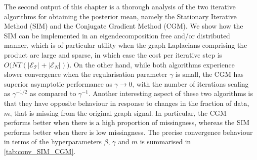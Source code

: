 The second output of this chapter is a thorough analysis of the two iterative algorithms for obtaining the posterior mean, namely the Stationary Iterative Method (SIM) and the Conjugate Gradient Method (CGM). We show how the SIM can be implemented in an eigendecomposition free and/or distributed manner, which is of particular utility when the graph Laplacians comprising the product are large and sparse, in which case the cost per iterative step is $O\big(NT(|\mathcal{E_T}| + |\mathcal{E}_N|)\big)$. On the other hand, while both algorithms experience slower convergence when the regularisation parameter $\gamma$ is small, the CGM has superior asymptotic performance as $\gamma \rightarrow 0$, with the number of iterations scaling as $\gamma^{-1/2}$ as compared to $\gamma^{-1}$. Another interesting aspect of these two algorithms is that they have opposite behaviour in response to changes in the fraction of data, $m$, that is missing from the original graph signal. In particular, the CGM performs better when there is a high proportion of missingness, whereas the SIM performs better when there is low missingness. The precise convergence behaviour in terms of the hyperparameters $\beta$, $\gamma$ and $m$ is summarised in \cref{tab:conv_SIM_CGM}. 





